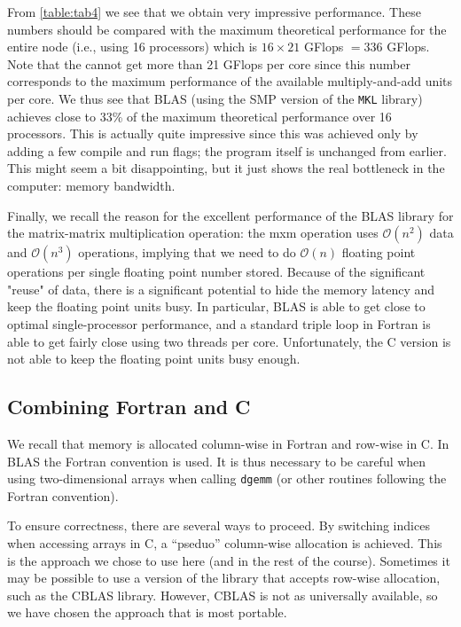 From \autoref{table:tab4} we see that we obtain very impressive performance.
These numbers should be compared with the maximum theoretical performance for
the entire node (i.e., using 16 processors) which is $16\times 21$ GFlops $=
336$ GFlops. Note that the cannot get more than 21 GFlops per core since this
number corresponds to the maximum performance of the available multiply-and-add
units per core. We thus see that BLAS (using the SMP version of the \texttt{MKL}
library) achieves close to 33\% of the maximum theoretical performance over 16
processors. This is actually quite impressive since this was achieved only by
adding a few compile and run flags; the program itself is unchanged from
earlier. This might seem a bit disappointing, but it just shows the real
bottleneck in the computer: memory bandwidth.

Finally, we recall the reason for the excellent performance of the BLAS library
for the matrix-matrix multiplication operation: the mxm operation uses
$\mathcal{O}(n^2)$ data and $\mathcal{O}(n^3)$ operations, implying that we need
to do $\mathcal{O}(n)$ floating point operations per single floating point
number stored. Because of the significant "reuse" of data, there is a
significant potential to hide the memory latency and keep the floating point
units busy. In particular, BLAS is able to get close to optimal single-processor
performance, and a standard triple loop in Fortran is able to get fairly close
using two threads per core. Unfortunately, the C version is not able to keep the
floating point units busy enough.

\subsection{Combining Fortran and C}

We recall that memory is allocated column-wise in Fortran and row-wise in C. In
BLAS the Fortran convention is used. It is thus necessary to be careful when
using two-dimensional arrays when calling \texttt{dgemm} (or other routines
following the Fortran convention).

To ensure correctness, there are several ways to proceed. By switching indices
when accessing arrays in C, a ``pseduo'' column-wise allocation is achieved.
This is the approach we chose to use here (and in the rest of the course).
Sometimes it may be possible to use a version of the library that accepts
row-wise allocation, such as the CBLAS library. However, CBLAS is not as
universally available, so we have chosen the approach that is most portable.

